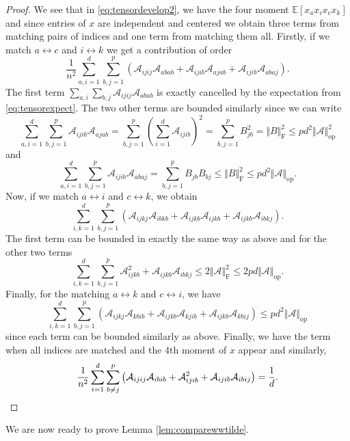 \documentclass[letterpaper, 10pt, dvipsnames]{article}
\numberwithin{equation}{section}
\let\O\relax
\newcommand{\O}[1]{\mathcal{O}\left(#1\right)}
\newcommand{\E}{\mathds{E}}
\theoremstyle{definition}
\begin{document}
\begin{proof}
We see that in \eqref{eq:tensordevelop2}, we have the four moment $\E[x_ax_ix_cx_k]$ and since entries of $x$ are independent and centered we obtain three terms from matching pairs of indices and one term from matching them all. Firstly, if we match $a\leftrightarrow c$ and $i\leftrightarrow k$ we get a contribution of order 
\[
  \frac{1}{n^2}\sum_{a,i=1}^d\sum_{b,j=1}^p\left(
    \mathcal{A}_{ijij}\mathcal{A}_{abab}+\mathcal{A}_{ijib}\mathcal{A}_{ajab}+\mathcal{A}_{ijib}\mathcal{A}_{abaj}
  \right).
\]
 The first term $\sum_{a,i}\sum_{b,j}\mathcal{A}_{ijij}\mathcal{A}_{abab}$ is exactly cancelled by the expectation from \eqref{eq:tensorexpect}. 
The two other terms are bounded similarly since we can write 
\[
\sum_{a,i=1}^d\sum_{b,j=1}^p \mathcal{A}_{ijib}\mathcal{A}_{ajab}
=
\sum_{b,j=1}^p \left(\sum_{i=1}^d \mathcal{A}_{ijib}\right)^2
=
\sum_{b,j=1}^p B_{jb}^2
=
\Vert B\Vert_\mathrm{F}^2
\leqslant pd^2\Vert \mathcal{A}\Vert_{\mathrm{op}}^2 
\]
and 
\[
\sum_{a,i=1}^d\sum_{b,j=1}^p \mathcal{A}_{ijib}\mathcal{A}_{abaj}
=
\sum_{b,j=1}^p B_{jb}B_{bj}
\leqslant \Vert B\Vert_\mathrm{F}^2
\leqslant pd^2\Vert \mathcal{A}\Vert_{\mathrm{op}}.
\]
Now, if we match $a\leftrightarrow i$ and $c\leftrightarrow k$, we obtain 
\[
  \sum_{i,k=1}^d\sum_{b,j=1}^p\left(
    \mathcal{A}_{ijkj}\mathcal{A}_{ibkb}+\mathcal{A}_{ijkb}\mathcal{A}_{ijkb}+\mathcal{A}_{ijkb}\mathcal{A}_{ibkj}
  \right).
\]
The first term can be bounded in exactly the same way as above and for the other two terms 
\[
\sum_{i,k=1}^d \sum_{b,j=1}^p \mathcal{A}_{ijkb}^2 + \mathcal{A}_{ijkb}\mathcal{A}_{ibkj} \leqslant 2\Vert \mathcal{A}\Vert_{\mathrm{F}}^2 \leqslant 2pd\Vert \mathcal{A}\Vert_{\mathrm{op}}.  
\]
Finally, for the matching $a\leftrightarrow k$ and $c\leftrightarrow i$, we have 
\[
  \sum_{i,k=1}^d\sum_{b,j=1}^p
  \left(
    \mathcal{A}_{ijkj}\mathcal{A}_{kbib}+\mathcal{A}_{ijkb}\mathcal{A}_{kjib}+\mathcal{A}_{ijkb}\mathcal{A}_{kbij}
  \right)
  \leqslant pd^2\Vert \mathcal{A}\Vert_{\mathrm{op}}
\]
since each term can be bounded similarly as above. Finally, we have the term when all indices are matched and the 4th moment of $x$ appear and similarly, 
\[
\frac{1}{n^2}\sum_{i=1}^d \sum_{b\neq j}^p\left(
  \mathcal{A}_{ijij}\mathcal{A}_{ibib}+\mathcal{A}_{ijib}^2+\mathcal{A}_{ijib}\mathcal{A}_{ibij}
\right)  
=
\O{\frac{1}{d}}.
\]
\end{proof}
We are now ready to prove Lemma \ref{lem:comparewwtilde}.
\end{document}
